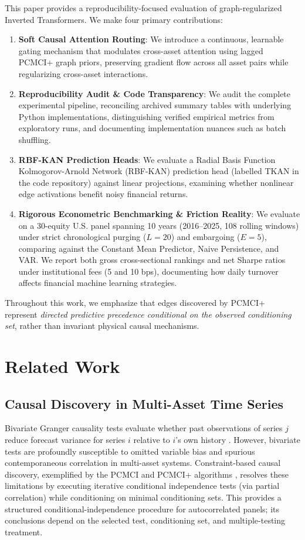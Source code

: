 \documentclass[10pt,twocolumn,a4paper]{article}
\begin{document}
This paper provides a reproducibility-focused evaluation of graph-regularized Inverted Transformers. We make four primary contributions:
\begin{enumerate}
    \item \textbf{Soft Causal Attention Routing}: We introduce a continuous, learnable gating mechanism that modulates cross-asset attention using lagged PCMCI+ graph priors, preserving gradient flow across all asset pairs while regularizing cross-asset interactions.
    \item \textbf{Reproducibility Audit \& Code Transparency}: We audit the complete experimental pipeline, reconciling archived summary tables with underlying Python implementations, distinguishing verified empirical metrics from exploratory runs, and documenting implementation nuances such as batch shuffling.
    \item \textbf{RBF-KAN Prediction Heads}: We evaluate a Radial Basis Function Kolmogorov-Arnold Network (RBF-KAN) prediction head (labelled TKAN in the code repository) against linear projections, examining whether nonlinear edge activations benefit noisy financial returns.
    \item \textbf{Rigorous Econometric Benchmarking \& Friction Reality}: We evaluate on a 30-equity U.S. panel spanning 10 years (2016--2025, 108 rolling windows) under strict chronological purging ($L=20$) and embargoing ($E=5$), comparing against the Constant Mean Predictor, Naive Persistence, and VAR. We report both gross cross-sectional rankings and net Sharpe ratios under institutional fees (5 and 10 bps), documenting how daily turnover affects financial machine learning strategies.
\end{enumerate}

Throughout this work, we emphasize that edges discovered by PCMCI+ represent \textit{directed predictive precedence conditional on the observed conditioning set}, rather than invariant physical causal mechanisms.

\section{Related Work}
\subsection{Causal Discovery in Multi-Asset Time Series}
Bivariate Granger causality tests evaluate whether past observations of series $j$ reduce forecast variance for series $i$ relative to $i$'s own history \cite{granger1969}. However, bivariate tests are profoundly susceptible to omitted variable bias and spurious contemporaneous correlation in multi-asset systems. Constraint-based causal discovery, exemplified by the PCMCI and PCMCI+ algorithms \cite{runge2020}, resolves these limitations by executing iterative conditional independence tests (via partial correlation) while conditioning on minimal conditioning sets. This provides a structured conditional-independence procedure for autocorrelated panels; its conclusions depend on the selected test, conditioning set, and multiple-testing treatment.
\end{document}
